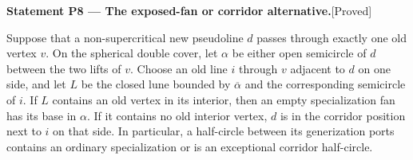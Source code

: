 \documentclass[11pt,a4paper]{article}
\newenvironment{resultenv}[3]{\par\medskip\phantomsection\label{#1}\noindent\textbf{Statement #1 --- #3.}\quad\textsf{[#2]}\par\smallskip\noindent\ignorespaces}{\par\medskip}
\begin{document}
\begin{resultenv}{P8}{Proved}{The exposed-fan or corridor alternative}
Suppose that a non-supercritical new pseudoline $d$ passes through
exactly one old vertex $v$.  On the spherical double cover, let $\alpha$ be either
open semicircle of $d$ between the two lifts of $v$.  Choose an old
line $i$ through $v$ adjacent to $d$ on one side, and let $L$ be the
closed lune bounded by $\overline\alpha$ and the corresponding
semicircle of $i$.  If $L$ contains an old vertex in its interior,
then an empty specialization fan has its base in $\alpha$.  If it
contains no old interior vertex, $d$ is in the corridor position next
to $i$ on that side.  In particular, a half-circle between its
generization ports contains an
ordinary specialization or is an exceptional corridor half-circle.
\end{resultenv}
\end{document}
